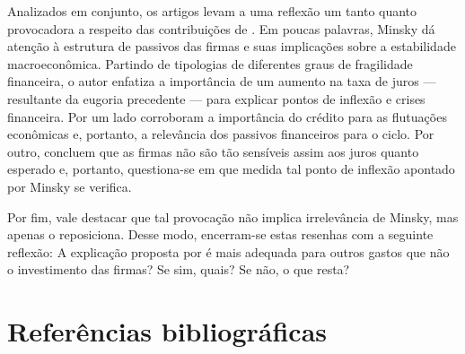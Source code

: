 \documentclass[11pt]{article}
\begin{document}
Analizados em conjunto, os artigos levam a uma reflexão um tanto quanto provocadora a respeito das contribuições de \cite{minsky_1977_Financial}.
Em poucas palavras, Minsky dá atenção à estrutura de passivos das firmas e suas implicações sobre a estabilidade macroeconômica.
Partindo de tipologias de diferentes graus de fragilidade financeira, o autor enfatiza a importância de um aumento na taxa de juros --- resultante da eugoria precedente ---  para explicar pontos de inflexão e crises financeira.
Por um lado \textcite{schularickCreditBoomsGone2012} corroboram a importância do crédito para as flutuações econômicas e, portanto, a relevância dos passivos financeiros para o ciclo. Por outro, \textcite{sharpe_2020_Why} concluem que as firmas não são tão sensíveis assim aos juros quanto esperado e, portanto, questiona-se em que medida tal ponto de inflexão apontado por Minsky se verifica.


Por fim, vale destacar que tal provocação não implica irrelevância de Minsky, mas apenas o reposiciona.
Desse modo, encerram-se estas resenhas com a seguinte reflexão: A explicação proposta por \textcite{minsky_1977_Financial} é mais adequada para outros gastos que não o investimento das firmas? Se sim, quais? Se não, o que resta?


\section*{Referências bibliográficas}
\label{sec:orgce6b166}
\printbibliography[heading=none]
\end{document}

